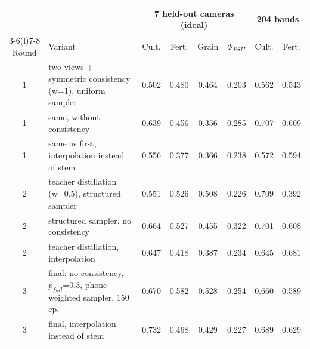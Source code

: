 \begin{tabular}{@{}clcccccc@{}}
\toprule
 & & \multicolumn{4}{c}{7 held-out cameras (ideal)} & \multicolumn{2}{c}{204 bands} \\
\cmidrule(lr){3-6}\cmidrule(l){7-8}
Round & Variant & Cult. & Fert. & Grain & $\Phi_{PSII}$ & Cult. & Fert. \\
\midrule
1 & two views + symmetric consistency (w=1), uniform sampler & 0.502 & 0.480 & 0.464 & 0.203 & 0.562 & 0.543 \\
1 & same, without consistency & 0.639 & 0.456 & 0.356 & 0.285 & 0.707 & 0.609 \\
1 & same as first, interpolation instead of stem & 0.556 & 0.377 & 0.366 & 0.238 & 0.572 & 0.594 \\
2 & teacher distillation (w=0.5), structured sampler & 0.551 & 0.526 & 0.508 & 0.226 & 0.709 & 0.392 \\
2 & structured sampler, no consistency & 0.664 & 0.527 & 0.455 & 0.322 & 0.701 & 0.608 \\
2 & teacher distillation, interpolation & 0.647 & 0.418 & 0.387 & 0.234 & 0.645 & 0.681 \\
3 & final: no consistency, $p_{full}$=0.3, phone-weighted sampler, 150 ep. & 0.670 & 0.582 & 0.528 & 0.254 & 0.660 & 0.589 \\
3 & final, interpolation instead of stem & 0.732 & 0.468 & 0.429 & 0.227 & 0.689 & 0.629 \\
\bottomrule
\end{tabular}
